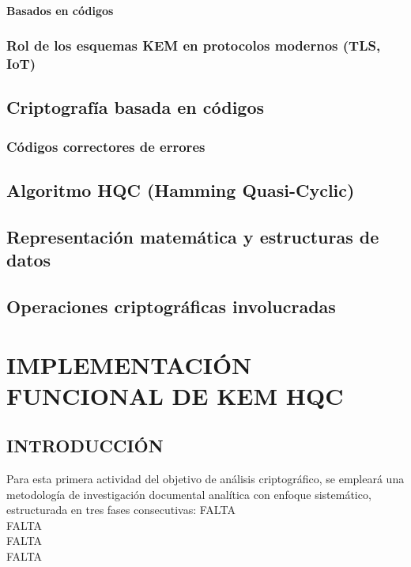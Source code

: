 \subsubsection{Basados en códigos}

\subsection{Rol de los esquemas KEM en protocolos modernos (TLS, IoT)}



\section{Criptografía basada en códigos}

\subsection{Códigos correctores de errores}



\section{Algoritmo HQC (Hamming Quasi-Cyclic)}



\section{Representación matemática y estructuras de datos}



\section{Operaciones criptográficas involucradas}


\newpage
\chapter{IMPLEMENTACIÓN FUNCIONAL DE KEM HQC}


\section{INTRODUCCIÓN}

Para esta primera actividad del objetivo de análisis criptográfico, se empleará una metodología de investigación documental analítica con enfoque sistemático, estructurada en tres fases consecutivas:
FALTA\\
FALTA\\
FALTA\\
FALTA 

